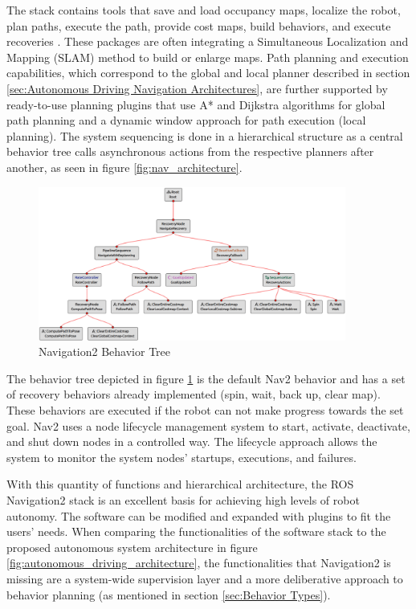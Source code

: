 The stack contains tools that save and load occupancy maps, localize the robot, plan paths, execute the path, provide cost maps, build behaviors, and execute recoveries \cite{macenski2020}. These packages are often integrating a Simultaneous Localization and Mapping (SLAM) method to build or enlarge maps. Path planning and execution capabilities, which correspond to the global and local planner described in section \ref{sec:Autonomous Driving Navigation Architectures}, are further supported by ready-to-use planning plugins that use A* and Dijkstra algorithms for global path planning and a dynamic window approach for path execution (local planning). The system sequencing is done in a hierarchical structure as a central behavior tree calls asynchronous actions from the respective planners after another, as seen in figure \ref{fig:nav_architecture}. 

\begin{figure}[ht]
	\centering
	\includegraphics[width=0.9\textwidth]{images/nav_bt-modified.png}
	\caption{Navigation2 Behavior Tree}
	\label{fig:bt_nav}
\end{figure}

The behavior tree depicted in figure \ref{fig:bt_nav} is the default Nav2 behavior and has a set of recovery behaviors already implemented (spin, wait, back up, clear map). These behaviors are executed if the robot can not make progress towards the set goal. Nav2 uses a node lifecycle management system to start, activate, deactivate, and shut down nodes in a controlled way. The lifecycle approach allows the system to monitor the system nodes' startups, executions, and failures.

With this quantity of functions and hierarchical architecture, the ROS Navigation2 stack is an excellent basis for achieving high levels of robot autonomy. The software can be modified and expanded with plugins to fit the users' needs. When comparing the functionalities of the software stack to the proposed autonomous system architecture in figure 	\ref{fig:autonomous_driving_architecture}, the functionalities that Navigation2 is missing are a system-wide supervision layer and a more deliberative approach to behavior planning (as mentioned in section \ref{sec:Behavior Types}).


